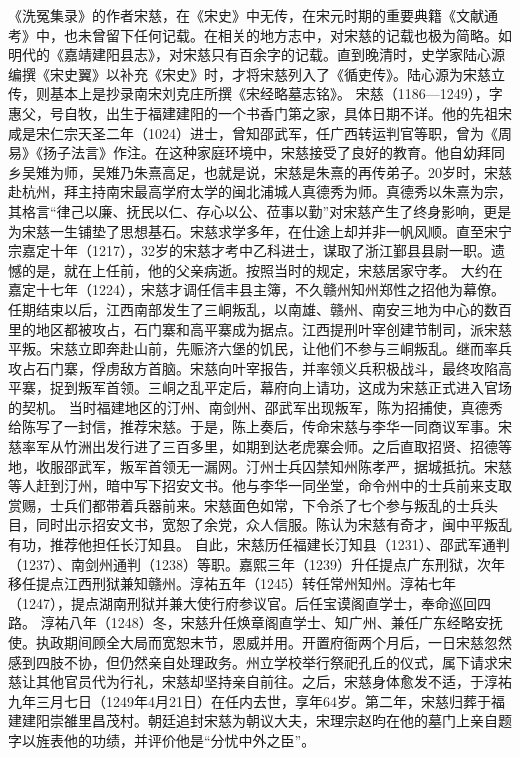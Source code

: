 \documentclass[12pt,UTF8]{ctexbook}
\begin{document}
《洗冤集录》的作者宋慈，在《宋史》中无传，在宋元时期的重要典籍《文献通考》中，也未曾留下任何记载。在相关的地方志中，对宋慈的记载也极为简略。如明代的《嘉靖建阳县志》，对宋慈只有百余字的记载。直到晚清时，史学家陆心源编撰《宋史翼》以补充《宋史》时，才将宋慈列入了《循吏传》。陆心源为宋慈立传，则基本上是抄录南宋刘克庄所撰《宋经略墓志铭》。
宋慈（1186—1249），字惠父，号自牧，出生于福建建阳的一个书香门第之家，具体日期不详。他的先祖宋咸是宋仁宗天圣二年（1024）进士，曾知邵武军，任广西转运判官等职，曾为《周易》《扬子法言》作注。在这种家庭环境中，宋慈接受了良好的教育。他自幼拜同乡吴雉为师，吴雉乃朱熹高足，也就是说，宋慈是朱熹的再传弟子。20岁时，宋慈赴杭州，拜主持南宋最高学府太学的闽北浦城人真德秀为师。真德秀以朱熹为宗，其格言“律己以廉、抚民以仁、存心以公、莅事以勤”对宋慈产生了终身影响，更是为宋慈一生铺垫了思想基石。宋慈求学多年，在仕途上却并非一帆风顺。直至宋宁宗嘉定十年（1217），32岁的宋慈才考中乙科进士，谋取了浙江鄞县县尉一职。遗憾的是，就在上任前，他的父亲病逝。按照当时的规定，宋慈居家守孝。
大约在嘉定十七年（1224），宋慈才调任信丰县主簿，不久赣州知州郑性之招他为幕僚。任期结束以后，江西南部发生了三峒叛乱，以南雄、赣州、南安三地为中心的数百里的地区都被攻占，石门寨和高平寨成为据点。江西提刑叶宰创建节制司，派宋慈平叛。宋慈立即奔赴山前，先赈济六堡的饥民，让他们不参与三峒叛乱。继而率兵攻占石门寨，俘虏敌方首脑。宋慈向叶宰报告，并率领义兵积极战斗，最终攻陷高平寨，捉到叛军首领。三峒之乱平定后，幕府向上请功，这成为宋慈正式进入官场的契机。
当时福建地区的汀州、南剑州、邵武军出现叛军，陈为招捕使，真德秀给陈写了一封信，推荐宋慈。于是，陈上奏后，传命宋慈与李华一同商议军事。宋慈率军从竹洲出发行进了三百多里，如期到达老虎寨会师。之后直取招贤、招德等地，收服邵武军，叛军首领无一漏网。汀州士兵囚禁知州陈孝严，据城抵抗。宋慈等人赶到汀州，暗中写下招安文书。他与李华一同坐堂，命令州中的士兵前来支取赏赐，士兵们都带着兵器前来。宋慈面色如常，下令杀了七个参与叛乱的士兵头目，同时出示招安文书，宽恕了余党，众人信服。陈认为宋慈有奇才，闽中平叛乱有功，推荐他担任长汀知县。
自此，宋慈历任福建长汀知县（1231）、邵武军通判（1237）、南剑州通判（1238）等职。嘉熙三年（1239）升任提点广东刑狱，次年移任提点江西刑狱兼知赣州。淳祐五年（1245）转任常州知州。淳祐七年（1247），提点湖南刑狱并兼大使行府参议官。后任宝谟阁直学士，奉命巡回四路。
淳祐八年（1248）冬，宋慈升任焕章阁直学士、知广州、兼任广东经略安抚使。执政期间顾全大局而宽恕末节，恩威并用。开置府衙两个月后，一日宋慈忽然感到四肢不协，但仍然亲自处理政务。州立学校举行祭祀孔丘的仪式，属下请求宋慈让其他官员代为行礼，宋慈却坚持亲自前往。之后，宋慈身体愈发不适，于淳祐九年三月七日（1249年4月21日）在任内去世，享年64岁。第二年，宋慈归葬于福建建阳崇雒里昌茂村。朝廷追封宋慈为朝议大夫，宋理宗赵昀在他的墓门上亲自题字以旌表他的功绩，并评价他是“分忧中外之臣”。
\end{document}
